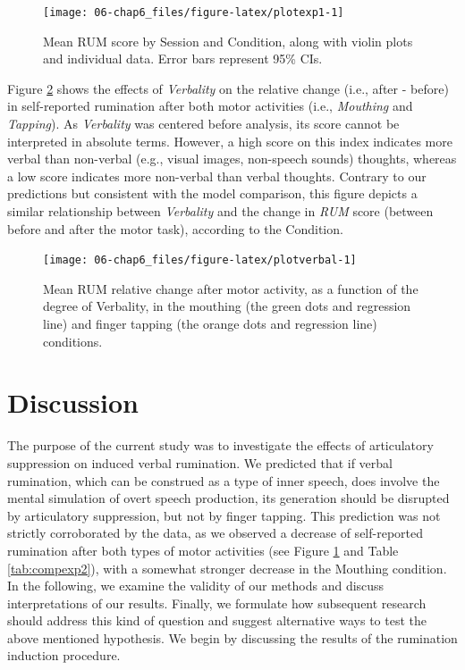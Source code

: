 \documentclass[a4paper,12pt,twoside,openright,oldfontcommands,final]{memoir}
\begin{document}
\begin{figure}[H]
\texttt{[image: 06-chap6\_files/figure-latex/plotexp1-1]} \caption{Mean RUM score by Session and Condition, along with violin plots and individual data. Error bars represent 95\% CIs.}\label{fig:plotexp1}
\end{figure}

Figure \ref{fig:plotverbal} shows the effects of \emph{Verbality} on the relative change (i.e., after - before) in self-reported rumination after both motor activities (i.e., \emph{Mouthing} and \emph{Tapping}). As \emph{Verbality} was centered before analysis, its score cannot be interpreted in absolute terms. However, a high score on this index indicates more verbal than non-verbal (e.g., visual images, non-speech sounds) thoughts, whereas a low score indicates more non-verbal than verbal thoughts. Contrary to our predictions but consistent with the model comparison, this figure depicts a similar relationship between \emph{Verbality} and the change in \emph{RUM} score (between before and after the motor task), according to the Condition.

\begin{figure}[H]
\texttt{[image: 06-chap6\_files/figure-latex/plotverbal-1]} \caption{Mean RUM relative change after motor activity, as a function of the degree of Verbality, in the mouthing (the green dots and regression line) and finger tapping (the orange dots and regression line) conditions.}\label{fig:plotverbal}
\end{figure}

\hypertarget{discussion-3}{%
\section{Discussion}\label{discussion-3}}

The purpose of the current study was to investigate the effects of articulatory suppression on induced verbal rumination. We predicted that if verbal rumination, which can be construed as a type of inner speech, does involve the mental simulation of overt speech production, its generation should be disrupted by articulatory suppression, but not by finger tapping. This prediction was not strictly corroborated by the data, as we observed a decrease of self-reported rumination after both types of motor activities (see Figure \ref{fig:plotexp1} and Table \ref{tab:compexp2}), with a somewhat stronger decrease in the Mouthing condition. In the following, we examine the validity of our methods and discuss interpretations of our results. Finally, we formulate how subsequent research should address this kind of question and suggest alternative ways to test the above mentioned hypothesis. We begin by discussing the results of the rumination induction procedure.
\end{document}
